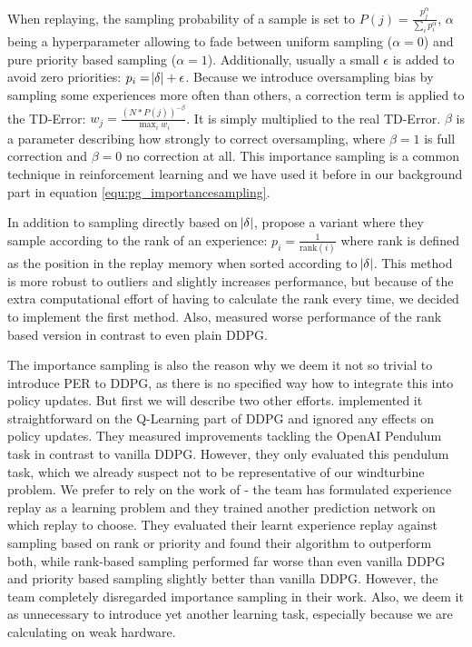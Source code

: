 \documentclass[hyperref,final,beleg]{cgvpub}
\begin{document}
When replaying, the sampling probability of a sample is set to $P(j) = \frac{p_j^{\alpha}}{\sum_i{p_i^{\alpha}}}$, $\alpha$ being a hyperparameter allowing to fade between uniform sampling ($\alpha=0$) and pure priority based sampling ($\alpha=1$). Additionally, usually a small $\epsilon$ is added to avoid zero priorities: $p_i = \abs{\delta} + \epsilon$. Because we introduce oversampling bias by sampling some experiences more often than others, a correction term is applied to the \ac{TD-Error}: $w_j = \frac{(N*P(j))^{-\beta}}{\max_i{w_i}}$. It is simply multiplied to the real \ac{TD-Error}. $\beta$ is a parameter describing how strongly to correct oversampling, where $\beta=1$ is full correction and $\beta=0$ no correction at all. This importance sampling is a common technique in reinforcement learning and we have used it before in our background part in equation \ref{equ:pg_importancesampling}.

In addition to sampling directly based on $\abs{\delta}$, \cite{schaulPrioritizedExperienceReplay2016} propose a variant where they sample according to the rank of an experience: $p_i = \frac{1}{\text{rank}(i)}$ where rank is defined as the position in the replay memory when sorted according to $\abs{\delta}$. This method is more robust to outliers and slightly increases performance, but because of the extra computational effort of having to calculate the rank every time, we decided to implement the first method. Also, \cite{zhaExperienceReplayOptimization2019} measured worse performance of the rank based version in contrast to even plain \ac{DDPG}.

The importance sampling is also the reason why we deem it not so trivial to introduce \ac{PER} to \ac{DDPG}, as there is no specified way how to integrate this into policy updates. But first we will describe two other efforts. \cite{houImprovingDDPGPrioritized} implemented it straightforward on the Q-Learning part of \ac{DDPG} and ignored any effects on policy updates. They measured improvements tackling the OpenAI Pendulum task in contrast to vanilla \ac{DDPG}. However, they only evaluated this pendulum task, which we already suspect not to be representative of our windturbine problem. We prefer to rely on the work of \cite{zhaExperienceReplayOptimization2019} - the team has formulated experience replay as a learning problem and they trained another prediction network on which replay to choose. They evaluated their learnt experience replay against sampling based on rank or priority and found their algorithm to outperform both, while rank-based sampling performed far worse than even vanilla \ac{DDPG} and priority based sampling slightly better than vanilla \ac{DDPG}. However, the team completely disregarded importance sampling in their work. Also, we deem it as unnecessary to introduce yet another learning task, especially because we are calculating on weak hardware.
\end{document}
